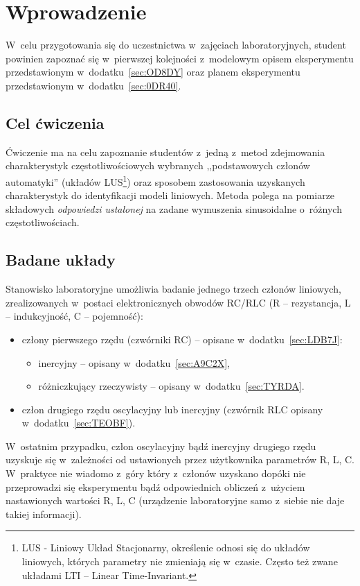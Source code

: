 \documentclass[paper=a4,DIV=12]{lpas}
\begin{document}
\section{Wprowadzenie}
\label{sec:AA9C2}

W~celu przygotowania się do uczestnictwa w~zajęciach laboratoryjnych, student
powinien zapoznać się w~pierwszej kolejności z~modelowym opisem eksperymentu
przedstawionym w~dodatku~\ref{sec:OD8DY} oraz planem eksperymentu
przedstawionym w~dodatku~\ref{sec:0DR40}.

\subsection{Cel ćwiczenia}
\label{sec:7HOCC}

Ćwiczenie ma na celu zapoznanie studentów z~jedną z~metod zdejmowania
charakterystyk częstotliwościowych wybranych ,,podstawowych członów
automatyki'' (układów LUS\footnote{LUS - Liniowy Układ Stacjonarny, określenie
odnosi się do układów liniowych, których parametry nie zmieniają się w~czasie.
Często też zwane układami LTI -- Linear Time-Invariant.}) oraz sposobem
zastosowania uzyskanych charakterystyk do identyfikacji modeli liniowych.
Metoda polega na pomiarze składowych {\em odpowiedzi ustalonej} na zadane
wymuszenia sinusoidalne o~różnych częstotliwościach.


\subsection{Badane układy}
\label{sec:ITWYS}

Stanowisko laboratoryjne umożliwia badanie jednego trzech członów liniowych,
zrealizowanych w~postaci elektronicznych obwodów RC/RLC (R -- rezystancja,
L -- indukcyjność, C -- pojemność):
\begin{itemize}
  \item człony pierwszego rzędu (czwórniki RC) -- opisane w~dodatku~\ref{sec:LDB7J}:
    \begin{itemize}
      \item inercyjny -- opisany w~dodatku~\ref{sec:A9C2X},
      \item różniczkujący rzeczywisty -- opisany w~dodatku~\ref{sec:TYRDA}.
    \end{itemize}
  \item człon drugiego rzędu oscylacyjny lub inercyjny (czwórnik RLC opisany w~dodatku~\ref{sec:TEOBF}).
\end{itemize}
W~ostatnim przypadku, człon oscylacyjny bądź inercyjny drugiego rzędu uzyskuje
się w~zależności od ustawionych przez użytkownika parametrów R, L, C.
W~praktyce nie wiadomo z~góry który z~członów uzyskano dopóki nie przeprowadzi
się eksperymentu bądź odpowiednich obliczeń z~użyciem nastawionych wartości R,
L, C (urządzenie laboratoryjne samo z~siebie nie daje takiej informacji).
\end{document}
